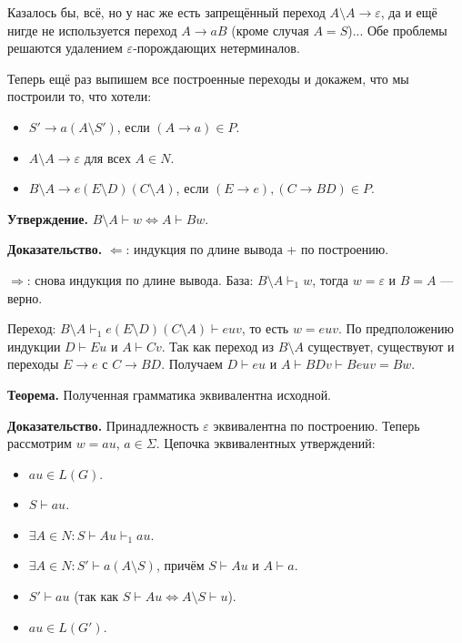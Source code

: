 Казалось бы, всё, но у нас же есть запрещённый переход $A \setminus A \to \varepsilon$, да и ещё нигде не используется переход $A \to aB$ (кроме случая $A = S$)...
Обе проблемы решаются удалением $\varepsilon$-порождающих нетерминалов.

Теперь ещё раз выпишем все построенные переходы и докажем, что мы построили то, что хотели:
\begin{itemize}
    \item $S' \to a(A \setminus S')$, если $(A \to a) \in P$.
    \item $A \setminus A \to \varepsilon$ для всех $A \in N$.
    \item $B \setminus A \to e(E \setminus D)(C \setminus A)$, если $(E \to e), (C \to BD) \in P$.
\end{itemize}

\textbf{Утверждение.} $B \setminus A \vdash w \iff A \vdash Bw$.

\textbf{Доказательство.} $\Leftarrow$: индукция по длине вывода + по построению.

$\Rightarrow$: снова индукция по длине вывода. База: $B \setminus A \vdash_1 w$, тогда $w = \varepsilon$ и $B = A$ --- верно.

Переход: $B \setminus A \vdash_1 e(E \setminus D)(C \setminus A) \vdash euv$, то есть $w = euv$.
По предположению индукции $D \vdash Eu$ и $A \vdash Cv$.
Так как переход из $B \setminus A$ существует, существуют и переходы $E \to e$ с $C \to BD$.
Получаем $D \vdash eu$ и $A \vdash BDv \vdash Beuv = Bw$.

\QED

\textbf{Теорема.} Полученная грамматика эквивалентна исходной.

\textbf{Доказательство.} Принадлежность $\varepsilon$ эквивалентна по построению. Теперь рассмотрим $w = au$, $a \in \Sigma$.
Цепочка эквивалентных утверждений:
\begin{itemize}
    \item $au \in L(G)$.
    \item $S \vdash au$.
    \item $\exists A \in N: S \vdash Au \vdash_1 au$.
    \item $\exists A \in N: S' \vdash a(A \setminus S)$, причём $S \vdash Au$ и $A \vdash a$.
    \item $S' \vdash au$ (так как $S \vdash Au \iff A \setminus S \vdash u$).
    \item $au \in L(G')$.
\end{itemize}

